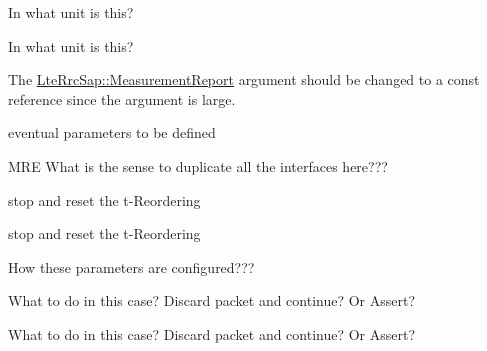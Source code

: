 \begin{DoxyRefList}
In what unit is this?  
\item[\label{todo__todo000087}%
\hypertarget{todo__todo000087}{}%
Member \hyperlink{classns3_1_1LteEnbPhy_a0df64498bdf6e3e601ea8567c8cc94f3}{ns3\+:\+:Lte\+Enb\+Phy\+:\+:m\+\_\+interference\+Sample\+Period} ]In what unit is this?  
\item[\label{todo__todo000088}%
\hypertarget{todo__todo000088}{}%
Member \hyperlink{classns3_1_1LteEnbRrc_a606ffef2d69bfc524b80fbec1082c59e}{ns3\+:\+:Lte\+Enb\+Rrc\+:\+:Receive\+Report\+Traced\+Callback} )(uint64\+\_\+t imsi, uint16\+\_\+t cell\+Id, uint16\+\_\+t rnti, \hyperlink{structns3_1_1LteRrcSap_1_1MeasurementReport}{Lte\+Rrc\+Sap\+::\+Measurement\+Report} report)]The {\ttfamily \hyperlink{structns3_1_1LteRrcSap_1_1MeasurementReport}{Lte\+Rrc\+Sap\+::\+Measurement\+Report}} argument should be changed to a const reference since the argument is large.  
\item[\label{todo__todo000089}%
\hypertarget{todo__todo000089}{}%
Member \hyperlink{classns3_1_1LteMacSapUser_accc7fc82f7c9b46d2a1550971b71ce8a}{ns3\+:\+:Lte\+Mac\+Sap\+User\+:\+:Notify\+Harq\+Delivery\+Failure} ()=0]eventual parameters to be defined  
\item[\label{todo__todo000096}%
\hypertarget{todo__todo000096}{}%
Member \hyperlink{classns3_1_1LteRlc_ae5a28f7f749925a56655b672810142f5}{ns3\+:\+:Lte\+Rlc\+:\+:Calculate\+Path\+Throughput} (std\+::ofstream $\ast$stream)=0]M\+RE What is the sense to duplicate all the interfaces here???  
\item[\label{todo__todo000090}%
\hypertarget{todo__todo000090}{}%
Member \hyperlink{classns3_1_1LteRlcAm_a9351b349aef796a3cda5946574e9435f}{ns3\+:\+:Lte\+Rlc\+Am\+:\+:Do\+Receive\+Pdu} (\hyperlink{classns3_1_1Ptr}{Ptr$<$ Packet $>$} p)]stop and reset the t-\/\+Reordering 

stop and reset the t-\/\+Reordering  
\item[\label{todo__todo000095}%
\hypertarget{todo__todo000095}{}%
Member \hyperlink{classns3_1_1LteRlcAm_adddd95c71f8402f62da0eef2b13aa49c}{ns3\+:\+:Lte\+Rlc\+Am\+:\+:m\+\_\+poll\+Pdu} ]How these parameters are configured???  
\item[\label{todo__todo000092}%
\hypertarget{todo__todo000092}{}%
Member \hyperlink{classns3_1_1LteRlcAm_a5ea384eb8654434de22432e79ee60364}{ns3\+:\+:Lte\+Rlc\+Am\+:\+:Reassemble} (\hyperlink{classns3_1_1Ptr}{Ptr$<$ Packet $>$} \hyperlink{classns3_1_1Packet}{Packet})]What to do in this case? Discard packet and continue? Or Assert?  
\item[\label{todo__todo000091}%
\hypertarget{todo__todo000091}{}%
Member \hyperlink{classns3_1_1LteRlcAm_ada1201339d0a54e50adc27b09d3c5c1e}{ns3\+:\+:Lte\+Rlc\+Am\+:\+:Reassemble\+And\+Deliver} (\hyperlink{classns3_1_1Ptr}{Ptr$<$ Packet $>$} packet)]What to do in this case? Discard packet and continue? Or Assert? 


\end{DoxyRefList}
